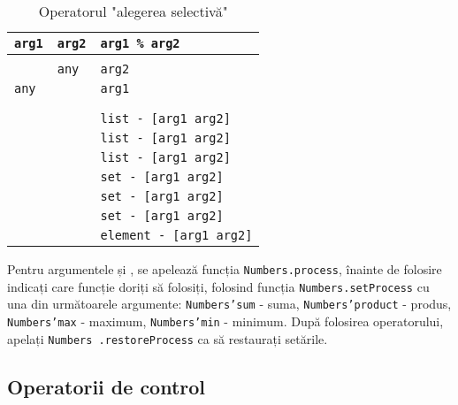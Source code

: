 \begin{table}[htb]
	\caption{Operatorul "alegerea selectivă"}
	\label{centhacktable}
	\begin{tabular}{|l|l|l|}
		\hline
		\texttt{arg1} & \texttt{arg2} & \texttt{arg1 \% arg2}			\\ \hline
		\void{}     & \void{}     & \void{}						\\ \hline
		\void{}     & \texttt{any}  & \texttt{arg2}					\\ \hline
		\texttt{any}  & \void{}     & \texttt{arg1}					\\ \hline
		\integer{}  & \integer{}  & \integer{}					\\ \hline
		\double{}   & \double{}   & \double{}					\\ \hline
		\str{}      & \str{}      & \texttt{list - [arg1 arg2]}	\\ \hline
		\listtype{} & \str{}      & \texttt{list - [arg1 arg2]}	\\ \hline
		\listtype{} & \listtype{} & \texttt{list - [arg1 arg2]}	\\ \hline
		\object{}   & \object{}   & \texttt{set - [arg1 arg2]}	\\ \hline
		\set{}      & \object{}   & \texttt{set - [arg1 arg2]}	\\ \hline
		\set{}      & \set{}      & \texttt{set - [arg1 arg2]}	\\ \hline
		\element{}  & \element{}  & \texttt{element - [arg1 arg2]}\\ \hline
	\end{tabular}
	\vspace{0em}
\end{table}

Pentru argumentele \integer{} și \double{}, se apelează funcția \texttt{Numbers.process}, înainte de folosire indicați care funcție doriți să folosiți, folosind funcția \texttt{Numbers.setProcess} cu una din următoarele argumente: \texttt{Numbers'sum} - suma, \texttt{Numbers'product} - produs, \texttt{Numbers'max} - maximum, \texttt{Numbers'min} - minimum. După folosirea operatorului, apelați \texttt{Numbers .restoreProcess} ca să restaurați setările.

\subsection{Operatorii de control}

